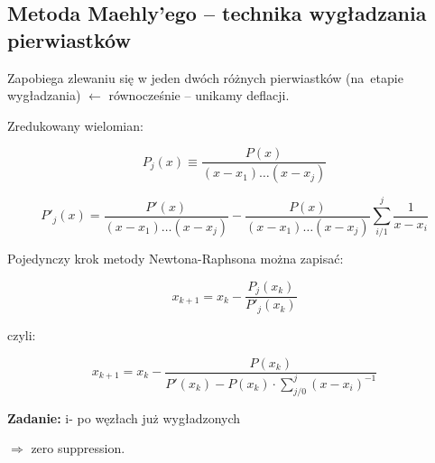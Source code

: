 \subsection{Metoda Maehly'ego -- technika wygładzania pierwiastków}

\begin{frame}
  Zapobiega zlewaniu się w jeden dwóch różnych pierwiastków (na~etapie wygładzania) $\leftarrow$ równocześnie -- unikamy deflacji.

  Zredukowany wielomian:

  $$P_j(x) \equiv \frac{P(x)}{(x - x_1)\ldots(x - x_j)}$$

  $$P'_j(x) = \frac{P'(x)}{(x - x_1)\ldots(x - x_j)} - \frac{P(x)}{(x - x_1)\ldots(x - x_j)} \sum_{i/1}^j \frac{1}{x - x_i}$$ %
\end{frame}

\begin{frame}
  Pojedynczy krok metody Newtona-Raphsona można zapisać:

  $$x_{k+1} = x_k - \frac{P_j(x_k)}{P'_j(x_k)}$$

  czyli:

  $$x_{k+1} = x_k - \frac{P(x_k)}{P'(x_k) - P(x_k) \cdot \sum_{j/0}^j(x - x_i)^{-1}}$$ %

  \textbf{Zadanie:} i- po węzłach już wygładzonych %

  $\Rightarrow$ zero suppression.
\end{frame}
